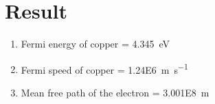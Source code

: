 	\section{Result}
	\begin{enumerate}
		\item Fermi energy of copper = \SI{4.345}{\electronvolt}
		\item Fermi speed of copper = \SI{1.24E6}{\meter\per\second}
		\item Mean free path of the electron = \SI{3.001E8}{\meter}
	\end{enumerate}
	
	

